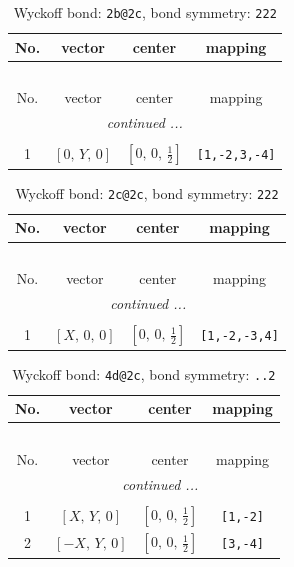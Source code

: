 \documentclass[fleqn,8pt]{jsarticle}
\begin{document}
\begin{longtable}{cccc}
\caption{Wyckoff bond: {\tt 2b@2c}, bond symmetry: {\tt 222}}
 \\
 \hline \hline
No. & vector & center & mapping \\ \hline \endfirsthead

\multicolumn{3}{l}{\tablename\ \thetable{}} \\
 \hline \hline
No. & vector & center & mapping \\ \hline \endhead

 \hline \hline
\multicolumn{3}{r}{\footnotesize\it continued ...} \\ \endfoot

 \hline \hline
\multicolumn{3}{r}{} \\ \endlastfoot

1 & $\left[ 0,\, Y,\, 0 \right]$ & $\left[ 0,\, 0,\, \frac{1}{2} \right]$ & {\tt [1,-2,3,-4]} \\
\end{longtable}
\renewcommand{\arraystretch}{1.2}
\begin{longtable}{cccc}
\caption{Wyckoff bond: {\tt 2c@2c}, bond symmetry: {\tt 222}}
 \\
 \hline \hline
No. & vector & center & mapping \\ \hline \endfirsthead

\multicolumn{3}{l}{\tablename\ \thetable{}} \\
 \hline \hline
No. & vector & center & mapping \\ \hline \endhead

 \hline \hline
\multicolumn{3}{r}{\footnotesize\it continued ...} \\ \endfoot

 \hline \hline
\multicolumn{3}{r}{} \\ \endlastfoot

1 & $\left[ X,\, 0,\, 0 \right]$ & $\left[ 0,\, 0,\, \frac{1}{2} \right]$ & {\tt [1,-2,-3,4]} \\
\end{longtable}
\renewcommand{\arraystretch}{1.2}
\begin{longtable}{cccc}
\caption{Wyckoff bond: {\tt 4d@2c}, bond symmetry: {\tt ..2}}
 \\
 \hline \hline
No. & vector & center & mapping \\ \hline \endfirsthead

\multicolumn{3}{l}{\tablename\ \thetable{}} \\
 \hline \hline
No. & vector & center & mapping \\ \hline \endhead

 \hline \hline
\multicolumn{3}{r}{\footnotesize\it continued ...} \\ \endfoot

 \hline \hline
\multicolumn{3}{r}{} \\ \endlastfoot

1 & $\left[ X,\, Y,\, 0 \right]$ & $\left[ 0,\, 0,\, \frac{1}{2} \right]$ & {\tt [1,-2]} \\ \hline
2 & $\left[ - X,\, Y,\, 0 \right]$ & $\left[ 0,\, 0,\, \frac{1}{2} \right]$ & {\tt [3,-4]} \\
\end{longtable}
\end{document}
